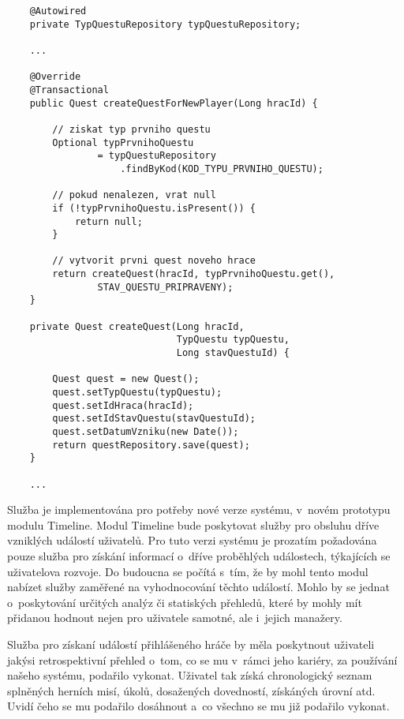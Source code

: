 \documentclass[twoside, 12pt]{article}
\begin{document}
{\begin{lstlisting}
    @Autowired
    private TypQuestuRepository typQuestuRepository;

    ...

    @Override
    @Transactional
    public Quest createQuestForNewPlayer(Long hracId) {

        // ziskat typ prvniho questu
        Optional typPrvnihoQuestu
                = typQuestuRepository
                    .findByKod(KOD_TYPU_PRVNIHO_QUESTU);

        // pokud nenalezen, vrat null
        if (!typPrvnihoQuestu.isPresent()) {
            return null;
        }

        // vytvorit prvni quest noveho hrace
        return createQuest(hracId, typPrvnihoQuestu.get(),
                STAV_QUESTU_PRIPRAVENY);
    }

    private Quest createQuest(Long hracId,
                              TypQuestu typQuestu,
                              Long stavQuestuId) {

        Quest quest = new Quest();
        quest.setTypQuestu(typQuestu);
        quest.setIdHraca(hracId);
        quest.setIdStavQuestu(stavQuestuId);
        quest.setDatumVzniku(new Date());
        return questRepository.save(quest);
    }

    ...

\end{lstlisting}

\clearpage


Služba je implementována pro potřeby nové verze systému, v~novém prototypu modulu Timeline.
Modul Timeline bude poskytovat služby pro obsluhu dříve vzniklých událostí uživatelů.
Pro tuto verzi systému je prozatím požadována pouze služba pro získání informací o~dříve
proběhlých událostech, týkajících se uživatelova rozvoje.
Do budoucna se počítá s~tím, že by mohl tento modul nabízet služby zaměřené na vyhodnocování těchto událostí.
Mohlo by se jednat o~poskytování určitých analýz či statiských přehledů,
které by mohly mít přidanou hodnout nejen pro uživatele samotné, ale i~jejich manažery.

Služba pro získaní událostí přihlášeného hráče by měla poskytnout
uživateli jakýsi retrospektivní přehled o~tom,
co se mu v~rámci jeho kariéry, za používání našeho systému, podařilo vykonat.
Uživatel tak získá chronologický seznam splněných herních misí, úkolů,
dosažených dovedností, získáných úrovní atd.
Uvidí čeho se mu podařilo dosáhnout a~co všechno se mu již podařilo vykonat.


}
\end{document}
